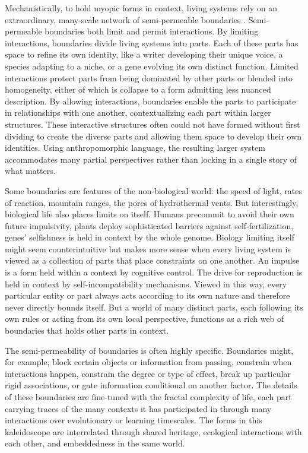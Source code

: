 \documentclass[11pt]{article}
\begin{document}
Mechanistically, to hold myopic forms in context, living systems rely on an extraordinary, many-scale network of semi-permeable boundaries \citep{maturana2012autopoiesis, simon1962architecture, kirchhoff2018markov, moreno2015biological}. Semi-permeable boundaries both limit and permit interactions. By limiting interactions, boundaries divide living systems into parts. Each of these parts has space to refine its own identity, like a writer developing their unique voice, a species adapting to a niche, or a gene evolving its own distinct function. Limited interactions protect parts from being dominated by other parts or blended into homogeneity, either of which is collapse to a form admitting less nuanced description. By allowing interactions, boundaries enable the parts to participate in relationships with one another, contextualizing each part within larger structures. These interactive structures often could not have formed without first dividing to create the diverse parts and allowing them space to develop their own identities. Using anthropomorphic language, the resulting larger system accommodates many partial perspectives rather than locking in a single story of what matters. 

Some boundaries are features of the non-biological world: the speed of light, rates of reaction, mountain ranges, the pores of hydrothermal vents. But interestingly, biological life also places limits on itself. Humans precommit to avoid their own future impulsivity, plants deploy sophisticated barriers against self-fertilization, genes' selfishness is held in context by the whole genome. Biology limiting itself might seem counterintuitive but makes more sense when every living system is viewed as a collection of parts that place constraints on one another. An impulse is a form held within a context by cognitive control. The drive for reproduction is held in context by self-incompatibility mechanisms. Viewed in this way, every particular entity or part always acts according to its own nature and therefore never directly bounds itself. But a world of many distinct parts, each following its own rules or acting from its own local perspective, functions as a rich web of boundaries that holds other parts in context.

The semi-permeability of boundaries is often highly specific. Boundaries might, for example, block certain objects or information from passing, constrain when interactions happen, constrain the degree or type of effect, break up particular rigid associations, or gate information conditional on another factor. The details of these boundaries are fine-tuned with the fractal complexity of life, each part carrying traces of the many contexts it has participated in through many interactions over evolutionary or learning timescales. The forms in this kaleidoscope are interrelated through shared heritage, ecological interactions with each other, and embeddedness in the same world.
\end{document}
